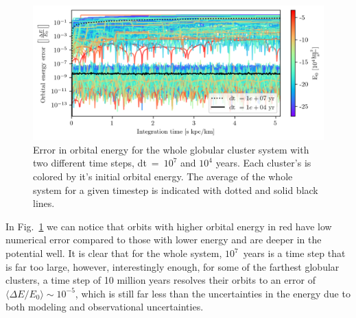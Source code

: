         \begin{figure}
            \centering
            \includegraphics[width=\linewidth]{images/numericalErrorLeapFrogVanilla.png}
            \caption{Error in orbital energy for the whole globular cluster system with two different time steps, dt~=~$10^{7}$ and $10^{4}$ years. Each cluster's is colored by it's initial orbital energy. The average of the whole system for a given timestep is indicated with dotted and solid black lines. }
            \label{fig:numericalErrorLeapFrogVanilla}
        \end{figure}
        In Fig.~\ref{fig:numericalErrorLeapFrogVanilla} we can notice that orbits with higher orbital energy in red have low numerical error compared to those with lower energy and are deeper in the potential well. It is clear that for the whole system, $10^7$~years is a time step that is far too large, however, interestingly enough, for some of the farthest globular clusters, a time step of 10 million years resolves their orbits to an error of $\langle \Delta E / E_0 \rangle \sim 10^{-5}$, which is still far less than the uncertainties in the energy due to both modeling and observational uncertainties.
    

